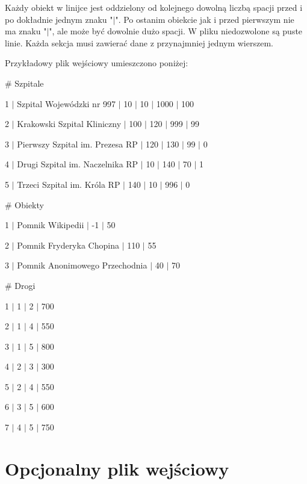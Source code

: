 \documentclass[10pt,a4paper]{article}
\begin{document}
Każdy obiekt w linijce jest oddzielony od kolejnego dowolną liczbą spacji przed i po dokładnie jednym znaku "$\mid$". Po ostanim obiekcie jak i przed pierwszym nie ma znaku "$\mid$", ale może być dowolnie dużo spacji. W pliku niedozwolone są puste linie. Każda sekcja musi zawierać dane z przynajmniej jednym wierszem.

Przykładowy plik wejściowy umieszczono poniżej:
\begin{description}[style=multiline,leftmargin=3cm]
\item \# Szpitale
\item 1 $\mid$ Szpital Wojewódzki nr 997 $\mid$ 10 $\mid$ 10 $\mid$ 1000 $\mid$ 100
\item 2 $\mid$ Krakowski Szpital Kliniczny $\mid$ 100 $\mid$ 120 $\mid$ 999 $\mid$ 99
\item 3 $\mid$ Pierwszy Szpital im. Prezesa RP $\mid$ 120 $\mid$ 130 $\mid$ 99 $\mid$ 0
\item 4 $\mid$ Drugi Szpital im. Naczelnika RP $\mid$ 10 $\mid$ 140 $\mid$ 70 $\mid$ 1
\item 5 $\mid$ Trzeci Szpital im. Króla RP $\mid$ 140 $\mid$ 10 $\mid$ 996 $\mid$ 0
\item \# Obiekty 
\item 1 $\mid$ Pomnik Wikipedii $\mid$ -1 $\mid$ 50
\item 2 $\mid$ Pomnik Fryderyka Chopina $\mid$ 110 $\mid$ 55
\item 3 $\mid$ Pomnik Anonimowego Przechodnia $\mid$ 40 $\mid$ 70
\item \# Drogi
\item 1 $\mid$ 1 $\mid$ 2 $\mid$ 700
\item 2 $\mid$ 1 $\mid$ 4 $\mid$ 550
\item 3 $\mid$ 1 $\mid$ 5 $\mid$ 800
\item 4 $\mid$ 2 $\mid$ 3 $\mid$ 300
\item 5 $\mid$ 2 $\mid$ 4 $\mid$ 550
\item 6 $\mid$ 3 $\mid$ 5 $\mid$ 600
\item 7 $\mid$ 4 $\mid$ 5 $\mid$ 750
\end{description}

\section{Opcjonalny plik wejściowy}
\end{document}
